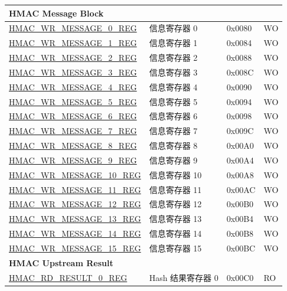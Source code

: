 \begin{longtable}{ | p{6cm} | p{7.2cm} | p{1.3cm} | p{1cm} | }
\multicolumn{4}{|l|}{\textbf{HMAC Message Block}} \\ \hline
\hyperref[regdesc:HMACWRMESSAGENREG]{HMAC\_WR\_MESSAGE\_0\_REG} & 信息寄存器 0 & 0x0080 & WO \\ \hline
\hyperref[regdesc:HMACWRMESSAGENREG]{HMAC\_WR\_MESSAGE\_1\_REG} & 信息寄存器 1 & 0x0084 & WO \\ \hline
\hyperref[regdesc:HMACWRMESSAGENREG]{HMAC\_WR\_MESSAGE\_2\_REG} & 信息寄存器 2 & 0x0088 & WO \\ \hline
\hyperref[regdesc:HMACWRMESSAGENREG]{HMAC\_WR\_MESSAGE\_3\_REG} & 信息寄存器 3 & 0x008C & WO \\ \hline
\hyperref[regdesc:HMACWRMESSAGENREG]{HMAC\_WR\_MESSAGE\_4\_REG} & 信息寄存器 4 & 0x0090 & WO \\ \hline
\hyperref[regdesc:HMACWRMESSAGENREG]{HMAC\_WR\_MESSAGE\_5\_REG} & 信息寄存器 5 & 0x0094 & WO \\ \hline
\hyperref[regdesc:HMACWRMESSAGENREG]{HMAC\_WR\_MESSAGE\_6\_REG} & 信息寄存器 6 & 0x0098 & WO \\ \hline
\hyperref[regdesc:HMACWRMESSAGENREG]{HMAC\_WR\_MESSAGE\_7\_REG} & 信息寄存器 7 & 0x009C & WO \\ \hline
\hyperref[regdesc:HMACWRMESSAGENREG]{HMAC\_WR\_MESSAGE\_8\_REG} & 信息寄存器 8 & 0x00A0 & WO \\ \hline
\hyperref[regdesc:HMACWRMESSAGENREG]{HMAC\_WR\_MESSAGE\_9\_REG} & 信息寄存器 9 & 0x00A4 & WO \\ \hline
\hyperref[regdesc:HMACWRMESSAGENREG]{HMAC\_WR\_MESSAGE\_10\_REG} & 信息寄存器 10 & 0x00A8 & WO \\ \hline
\hyperref[regdesc:HMACWRMESSAGENREG]{HMAC\_WR\_MESSAGE\_11\_REG} & 信息寄存器 11 & 0x00AC & WO \\ \hline
\hyperref[regdesc:HMACWRMESSAGENREG]{HMAC\_WR\_MESSAGE\_12\_REG} & 信息寄存器 12 & 0x00B0 & WO \\ \hline
\hyperref[regdesc:HMACWRMESSAGENREG]{HMAC\_WR\_MESSAGE\_13\_REG} & 信息寄存器 13 & 0x00B4 & WO \\ \hline
\hyperref[regdesc:HMACWRMESSAGENREG]{HMAC\_WR\_MESSAGE\_14\_REG} & 信息寄存器 14 & 0x00B8 & WO \\ \hline
\hyperref[regdesc:HMACWRMESSAGENREG]{HMAC\_WR\_MESSAGE\_15\_REG} & 信息寄存器 15 & 0x00BC & WO \\ \hline
\multicolumn{4}{|l|}{\textbf{HMAC Upstream Result}} \\ \hline
\hyperref[regdesc:HMACRDRESULTNREG]{HMAC\_RD\_RESULT\_0\_REG} & Hash 结果寄存器 0 & 0x00C0 & RO \\ \hline

\end{longtable}
